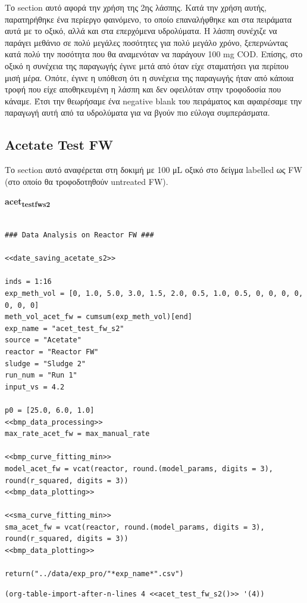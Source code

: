 \documentclass[11pt]{article}
\begin{document}
Το section αυτό αφορά την χρήση της 2ης λάσπης. Κατά την χρήση αυτής, παρατηρήθηκε ένα περίεργο φαινόμενο, το οποίο επαναλήφθηκε και στα πειράματα αυτά με το οξικό, αλλά και στα επερχόμενα υδρολύματα. Η λάσπη συνέχιζε να παράγει μεθάνιο σε πολύ μεγάλες ποσότητες για πολύ μεγάλο χρόνο, ξεπερνώντας κατά πολύ την ποσότητα που θα αναμενόταν να παράγουν 100 mg COD. Επίσης, στο οξικό η συνέχεια της παραγωγής έγινε μετά από όταν είχε σταματήσει για περίπου μισή μέρα. Οπότε, έγινε η υπόθεση ότι η συνέχεια της παραγωγής ήταν από κάποια τροφή που είχε αποθηκευμένη η λάσπη και δεν οφειλόταν στην τροφοδοσία που κάναμε. Έτσι την θεωρήσαμε ένα negative blank του πειράματος και αφαιρέσαμε την παραγωγή αυτή από τα υδρολύματα για να βγούν πιο εύλογα συμπεράσματα.

\subsection{Acetate Test FW}
\label{sec:org4c3952a}
Το section αυτό αναφέρεται στη δοκιμή με 100 μL οξικό στο δείγμα labelled ως FW (στο οποίο θα τροφοδοτηθούν untreated FW). 

\textbf{acet\textsubscript{test}\textsubscript{fw}\textsubscript{s2}}
\begin{verbatim}

### Data Analysis on Reactor FW ###

<<date_saving_acetate_s2>>

inds = 1:16
exp_meth_vol = [0, 1.0, 5.0, 3.0, 1.5, 2.0, 0.5, 1.0, 0.5, 0, 0, 0, 0, 0, 0, 0]
meth_vol_acet_fw = cumsum(exp_meth_vol)[end]
exp_name = "acet_test_fw_s2"
source = "Acetate"
reactor = "Reactor FW"
sludge = "Sludge 2"
run_num = "Run 1"
input_vs = 4.2

p0 = [25.0, 6.0, 1.0]
<<bmp_data_processing>>
max_rate_acet_fw = max_manual_rate

<<bmp_curve_fitting_min>>
model_acet_fw = vcat(reactor, round.(model_params, digits = 3), round(r_squared, digits = 3))
<<bmp_data_plotting>>

<<sma_curve_fitting_min>>
sma_acet_fw = vcat(reactor, round.(model_params, digits = 3), round(r_squared, digits = 3))  
<<bmp_data_plotting>>

return("../data/exp_pro/"*exp_name*".csv")
\end{verbatim}

\begin{verbatim}
(org-table-import-after-n-lines 4 <<acet_test_fw_s2()>> '(4))
\end{verbatim}
\end{document}
